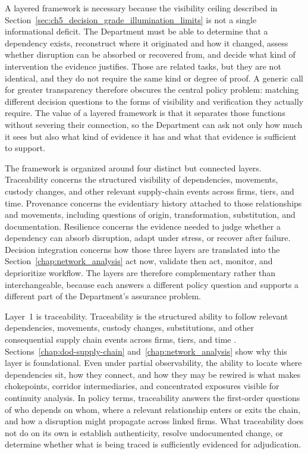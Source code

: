 A layered framework is necessary because the visibility ceiling described in Section~\ref{sec:ch5_decision_grade_illumination_limits} is not a single informational deficit. The Department must be able to determine that a dependency exists, reconstruct where it originated and how it changed, assess whether disruption can be absorbed or recovered from, and decide what kind of intervention the evidence justifies. Those are related tasks, but they are not identical, and they do not require the same kind or degree of proof. A generic call for greater transparency therefore obscures the central policy problem: matching different decision questions to the forms of visibility and verification they actually require. The value of a layered framework is that it separates those functions without severing their connection, so the Department can ask not only how much it sees but also what kind of evidence it has and what that evidence is sufficient to support.

The framework is organized around four distinct but connected layers. Traceability concerns the structured visibility of dependencies, movements, custody changes, and other relevant supply-chain events across firms, tiers, and time. Provenance concerns the evidentiary history attached to those relationships and movements, including questions of origin, transformation, substitution, and documentation. Resilience concerns the evidence needed to judge whether a dependency can absorb disruption, adapt under stress, or recover after failure. Decision integration concerns how those three layers are translated into the Section~\ref{chap:network_analysis} act now, validate then act, monitor, and deprioritize workflow. The layers are therefore complementary rather than interchangeable, because each answers a different policy question and supports a different part of the Department's assurance problem.

Layer~1 is traceability. Traceability is the structured ability to follow relevant dependencies, movements, custody changes, substitutions, and other consequential supply chain events across firms, tiers, and time \parencite{ch5_dod2022_supplychains,ch5_nist800161r1upd1}. Sections~\ref{chap:dod-supply-chain} and~\ref{chap:network_analysis} show why this layer is foundational. Even under partial observability, the ability to locate where dependencies sit, how they connect, and how they may be rewired is what makes chokepoints, corridor intermediaries, and concentrated exposures visible for continuity analysis. In policy terms, traceability answers the first-order questions of who depends on whom, where a relevant relationship enters or exits the chain, and how a disruption might propagate across linked firms. What traceability does not do on its own is establish authenticity, resolve undocumented change, or determine whether what is being traced is sufficiently evidenced for adjudication.

